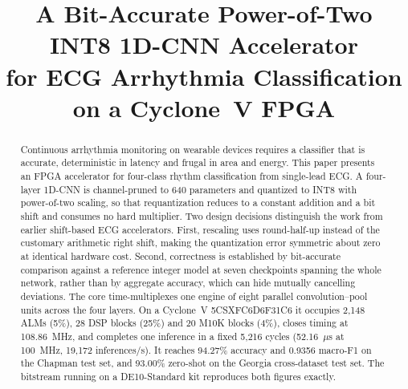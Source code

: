 \documentclass[conference,10pt]{IEEEtran}
\begin{document}
\title{A Bit-Accurate Power-of-Two INT8 1D-CNN Accelerator\\
for ECG Arrhythmia Classification on a Cyclone~V FPGA}

\author{
\and
{}
}

\maketitle

\begin{abstract}
Continuous arrhythmia monitoring on wearable devices requires a classifier that
is accurate, deterministic in latency and frugal in area and energy. This paper
presents an FPGA accelerator for four-class rhythm classification from
single-lead ECG. A four-layer 1D-CNN is channel-pruned to 640 parameters and
quantized to INT8 with power-of-two scaling, so that requantization reduces to a
constant addition and a bit shift and consumes no hard multiplier. Two design
decisions distinguish the work from earlier shift-based ECG accelerators. First,
rescaling uses round-half-up instead of the customary arithmetic right shift,
making the quantization error symmetric about zero at identical hardware cost.
Second, correctness is established by bit-accurate comparison against a reference
integer model at seven checkpoints spanning the whole network, rather than by
aggregate accuracy, which can hide mutually cancelling deviations. The core
time-multiplexes one engine of eight parallel convolution--pool units across the
four layers. On a Cyclone~V 5CSXFC6D6F31C6 it occupies 2{,}148 ALMs (5\%), 28 DSP
blocks (25\%) and 20 M10K blocks (4\%), closes timing at 108.86~MHz, and completes
one inference in a fixed 5{,}216 cycles (52.16~$\mu$s at 100~MHz, 19{,}172
inferences/s). It reaches 94.27\% accuracy and 0.9356 macro-F1 on the Chapman
test set, and 93.00\% zero-shot on the Georgia cross-dataset test set. The
bitstream running on a DE10-Standard kit reproduces both figures exactly.
\end{abstract}
\end{document}
